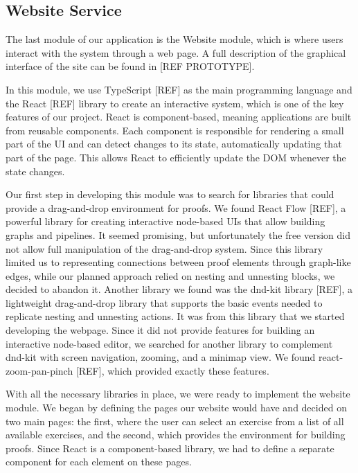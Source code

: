 \subsection{Website Service}
The last module of our application is the Website module, which is where users interact with the system through a web page. A full description of the graphical interface of the site can be found in [REF PROTOTYPE].

In this module, we use TypeScript [REF] as the main programming language and the React [REF] library to create an interactive system, which is one of the key features of our project. React is component-based, meaning applications are built from reusable components. Each component is responsible for rendering a small part of the UI and can detect changes to its state, automatically updating that part of the page. This allows React to efficiently update the DOM whenever the state changes.

Our first step in developing this module was to search for libraries that could provide a drag-and-drop environment for proofs. We found React Flow [REF], a powerful library for creating interactive node-based UIs that allow building graphs and pipelines. It seemed promising, but unfortunately the free version did not allow full manipulation of the drag-and-drop system. Since this library limited us to representing connections between proof elements through graph-like edges, while our planned approach relied on nesting and unnesting blocks, we decided to abandon it. Another library we found was the dnd-kit library [REF], a lightweight drag-and-drop library that supports the basic events needed to replicate nesting and unnesting actions. It was from this library that we started developing the webpage. Since it did not provide features for building an interactive node-based editor, we searched for another library to complement dnd-kit with screen navigation, zooming, and a minimap view. We found react-zoom-pan-pinch [REF], which provided exactly these features.

With all the necessary libraries in place, we were ready to implement the website module. We began by defining the pages our website would have and decided on two main pages: the first, where the user can select an exercise from a list of all available exercises, and the second, which provides the environment for building proofs. Since React is a component-based library, we had to define a separate component for each element on these pages.

